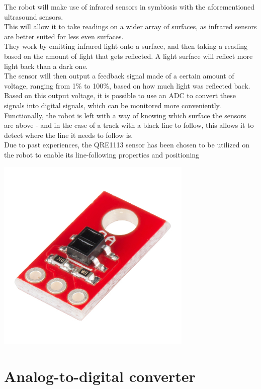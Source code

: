 The robot will make use of infrared sensors in symbiosis with the aforementioned ultrasound sensors.\\ This will allow it to take readings on a wider array of surfaces, as infrared sensors are better suited for less even surfaces.\\ They work by emitting infrared light onto a surface, and then taking a reading based on the amount of light that gets reflected. A light surface will reflect more light back than a dark one.\\ The sensor will then output a feedback signal made of a certain amount of voltage, ranging from 1\% to 100\%, based on how much light was reflected back. Based on this output voltage, it is possible to use an ADC to convert these signals into digital signals, which can be monitored more conveniently.\\ Functionally, the robot is left with a way of knowing which surface the sensors are above - and in the case of a track with a black line to follow, this allows it to detect where the line it needs to follow is.\\

Due to past experiences, the QRE1113 sensor has been chosen to be utilized on the robot to enable its line-following properties and positioning

\includegraphics[width=0.7\textwidth]{figures/QRE.jpg}

\section{Analog-to-digital converter}



